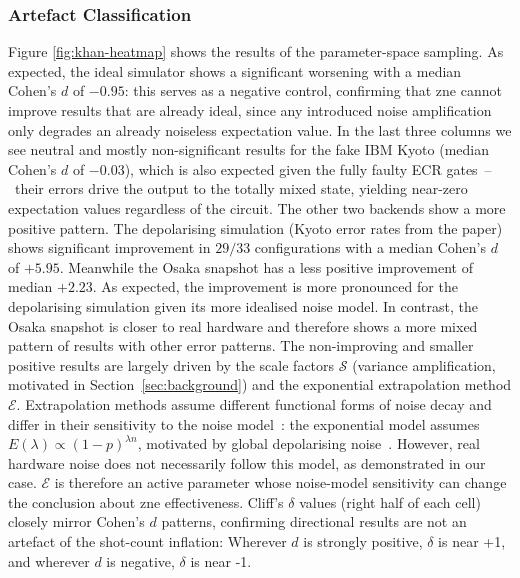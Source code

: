 \documentclass[10pt,conference]{IEEEtran}
\begin{document}
\subsubsection{Artefact Classification}
Figure \ref{fig:khan-heatmap} shows the results of the parameter-space sampling. As expected, the ideal simulator shows a significant worsening with a median Cohen's $d$ of $-0.95$: this serves as a negative control, confirming that \gls{zne} cannot improve results that are already ideal, since any introduced noise amplification only degrades an already noiseless expectation value. In the last three columns we see neutral and mostly non-significant results for the fake IBM Kyoto (median Cohen's $d$ of $-0.03$), which is also expected given the fully faulty ECR gates~--~their errors drive the output to the totally mixed state, yielding near-zero expectation values regardless of the circuit. The other two backends show a more positive pattern. The depolarising simulation (Kyoto error rates from the paper) shows significant improvement in $29/33$ configurations with a median Cohen's $d$ of $+5.95$. Meanwhile the Osaka snapshot has a less positive improvement of median $+2.23$. As expected, the improvement is more pronounced for the depolarising simulation given its more idealised noise model. In contrast, the Osaka snapshot is closer to real hardware and therefore shows a more mixed pattern of results with other error patterns. The non-improving and smaller positive results are largely driven by the scale factors $\mathcal{S}$ (variance amplification, motivated in Section~\ref{sec:background}) and the exponential extrapolation method $\mathcal{E}$. Extrapolation methods assume different functional forms of noise decay and differ in their sensitivity to the noise model~\cite{endo_practical_2018,giurgica-tiron_digital_2020}: the exponential model assumes $E(\lambda) \propto (1-p)^{\lambda n}$, motivated by global depolarising noise~\cite{endo_practical_2018}. However, real hardware noise does not necessarily follow this model, as demonstrated in our case. $\mathcal{E}$ is therefore an active parameter whose noise-model sensitivity can change the conclusion about \gls{zne} effectiveness. Cliff's $\delta$ values (right half of each cell) closely mirror Cohen's $d$ patterns, confirming directional results are not an artefact of the shot-count inflation: Wherever $d$ is strongly positive, $\delta$ is near +1, and wherever $d$ is negative, $\delta$ is near -1.
\end{document}
